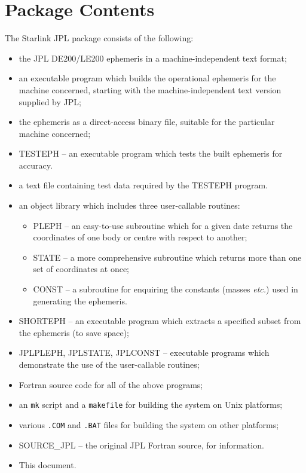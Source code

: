 \section{Package Contents}
The Starlink JPL package consists of the following:
\begin{itemize}
\item the JPL DE200/LE200 ephemeris
in a machine-independent text format;
\item an executable program which builds the operational ephemeris
for the machine concerned, starting with the machine-independent
text version supplied by JPL;
\item the ephemeris as a direct-access binary file, suitable for
the particular machine concerned;
\item TESTEPH -- an executable program which tests the built ephemeris for
accuracy.
\item a text file containing test data required
by the TESTEPH program.
\item an object library which includes three user-callable routines:
\begin{itemize}
\item PLEPH -- an easy-to-use subroutine which for a given date
returns the coordinates of one body or centre with respect to another;
\item STATE -- a more comprehensive subroutine which returns more
than one set of coordinates at once;
\item CONST -- a subroutine for enquiring the constants (masses {\it etc.})
used in generating the ephemeris.
\end{itemize}
\item SHORTEPH -- an executable program which extracts a specified
subset from the ephemeris (to save space);
\item JPLPLEPH, JPLSTATE, JPLCONST -- executable programs which demonstrate
the use of the user-callable routines;
\item Fortran source code for all of the above programs;
\item an \verb|mk| script and a \verb|makefile| for building the
system on Unix platforms;
\item various \verb|.COM| and \verb|.BAT| files for building the
system on other platforms;
\item SOURCE\_JPL -- the original JPL Fortran source, for information.
\item This document.
\end{itemize}

